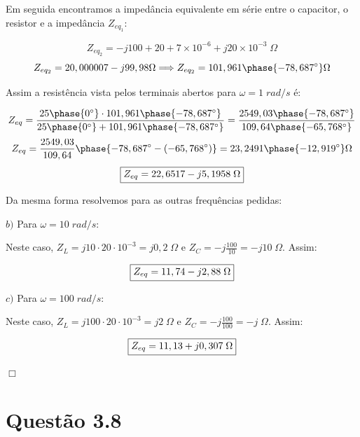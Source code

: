 \documentclass[
	12pt,				%
	oneside,			%
	a4paper,			%
	english,			%
	french,				%
	spanish,			%
	brazil				%
	]{abntex2}
\begin{document}
Em seguida encontramos a impedância equivalente em série entre o capacitor, o resistor e a impedância $Z_{eq_1}$:

$$Z_{eq_2} = -j100 + 20 + 7\times10^{-6} + j20\times10^{-3}\;\Omega$$
$$Z_{eq_2} = 20,000007 - j99,98 \Omega \Longrightarrow Z_{eq_2} = 101,961\phase{-78,687^\circ}\Omega$$

Assim a resistência vista pelos terminais abertos para $\omega = 1\;rad/s$ é:

$$Z_{eq} = \dfrac{25\phase{0^\circ} \cdot 101,961\phase{-78,687^\circ}}{25\phase{0^\circ} + 101,961\phase{-78,687^\circ}} =\dfrac{2549,03\phase{-78,687^\circ}}{109,64\phase{-65,768^\circ}}$$
$$Z_{eq} = \dfrac{2549,03}{109,64}\phase{-78,687^\circ-(-65,768^\circ)} = 23,2491\phase{-12,919^\circ} \Omega$$
\begin{equation}
    \centering
    \fbox{$Z_{eq} = 22,6517 - j5,1958\;\Omega$}
\end{equation}
\newpage


Da mesma forma resolvemos para as outras frequências pedidas:

$b)$ Para $\omega = 10\;rad/s$:

Neste caso, $Z_L=j10\cdot20\cdot10^{-3} = j0,2\;\Omega$ e $Z_C=-j\frac{100}{10}=-j10\;\Omega$. Assim:

\begin{equation}
    \centering
    \fbox{$Z_{eq} = 11,74 - j2,88\;\Omega$}
\end{equation}

$c)$ Para $\omega = 100\;rad/s$:

Neste caso, $Z_L=j100\cdot20\cdot10^{-3} = j2\;\Omega$ e $Z_C=-j\frac{100}{100}=-j\;\Omega$. Assim:

\begin{equation}
    \centering
    \fbox{$Z_{eq} = 11,13 + j0,307\;\Omega$}
\end{equation}

\begin{flushright}
    $\Box$
\end{flushright}

\newpage

\section*{Questão 3.8}
\end{document}
